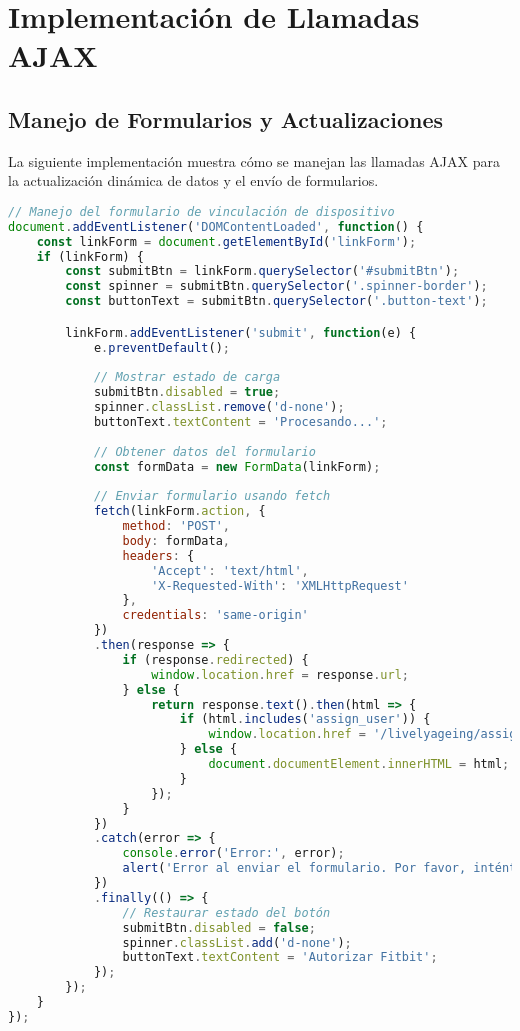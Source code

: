 \section{Implementación de Llamadas AJAX}
\label{sec:anexo_ajax}

\subsection{Manejo de Formularios y Actualizaciones}
\label{subsec:anexo_formularios}
La siguiente implementación muestra cómo se manejan las llamadas AJAX para la actualización dinámica de datos y el envío de formularios.

\begin{lstlisting}[language=JavaScript, caption=Implementación de llamadas AJAX para formularios y actualizaciones]
// Manejo del formulario de vinculación de dispositivo
document.addEventListener('DOMContentLoaded', function() {
    const linkForm = document.getElementById('linkForm');
    if (linkForm) {
        const submitBtn = linkForm.querySelector('#submitBtn');
        const spinner = submitBtn.querySelector('.spinner-border');
        const buttonText = submitBtn.querySelector('.button-text');

        linkForm.addEventListener('submit', function(e) {
            e.preventDefault();
            
            // Mostrar estado de carga
            submitBtn.disabled = true;
            spinner.classList.remove('d-none');
            buttonText.textContent = 'Procesando...';
            
            // Obtener datos del formulario
            const formData = new FormData(linkForm);
            
            // Enviar formulario usando fetch
            fetch(linkForm.action, {
                method: 'POST',
                body: formData,
                headers: {
                    'Accept': 'text/html',
                    'X-Requested-With': 'XMLHttpRequest'
                },
                credentials: 'same-origin'
            })
            .then(response => {
                if (response.redirected) {
                    window.location.href = response.url;
                } else {
                    return response.text().then(html => {
                        if (html.includes('assign_user')) {
                            window.location.href = '/livelyageing/assign';
                        } else {
                            document.documentElement.innerHTML = html;
                        }
                    });
                }
            })
            .catch(error => {
                console.error('Error:', error);
                alert('Error al enviar el formulario. Por favor, inténtalo de nuevo.');
            })
            .finally(() => {
                // Restaurar estado del botón
                submitBtn.disabled = false;
                spinner.classList.add('d-none');
                buttonText.textContent = 'Autorizar Fitbit';
            });
        });
    }
});


\end{lstlisting}
